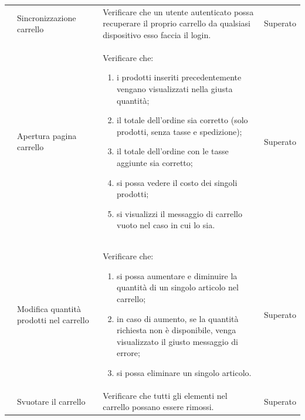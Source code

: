 \begin{center}
\begin{longtable}{|p{0.85cm}|p{2.25cm}|p{9cm}|p{3cm}|}
		 & Sincronizzazione carrello & Verificare che un utente autenticato possa recuperare il proprio carrello da qualsiasi dispositivo esso faccia il login. & Superato\\

		 & Apertura pagina carrello & Verificare che: 
		\begin{enumerate}
			\item i prodotti inseriti precedentemente vengano visualizzati nella giusta quantità;
			\item il totale dell'ordine sia corretto (solo prodotti, senza tasse e spedizione);
			\item il totale dell'ordine con le tasse aggiunte sia corretto;
			\item si possa vedere il costo dei singoli prodotti;
			\item si visualizzi il messaggio di carrello vuoto nel caso in cui lo sia.
		\end{enumerate}  & Superato\\

		 & Modifica quantità prodotti nel carrello & Verificare che:
		\begin{enumerate}
			\item si possa aumentare e diminuire la quantità di un singolo articolo nel carrello;
			\item in caso di aumento, se la quantità richiesta non è disponibile, venga visualizzato il giusto messaggio di errore;
			\item si possa eliminare un singolo articolo.
		\end{enumerate} & Superato\\

		 & Svuotare il carrello & Verificare che tutti gli elementi nel carrello possano essere rimossi. & Superato\\


\end{longtable}
\end{center}
